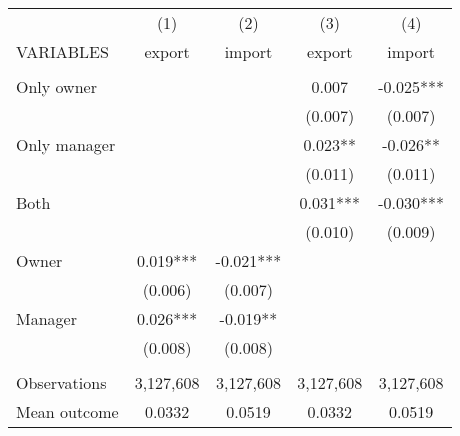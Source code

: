 \begin{tabular}{lcccc} \hline
 & (1) & (2) & (3) & (4) \\
VARIABLES & export & import & export & import \\ \hline
 &  &  &  &  \\
Only owner &  &  & 0.007 & -0.025*** \\
 &  &  & (0.007) & (0.007) \\
Only manager &  &  & 0.023** & -0.026** \\
 &  &  & (0.011) & (0.011) \\
Both &  &  & 0.031*** & -0.030*** \\
 &  &  & (0.010) & (0.009) \\
Owner & 0.019*** & -0.021*** &  &  \\
 & (0.006) & (0.007) &  &  \\
Manager & 0.026*** & -0.019** &  &  \\
 & (0.008) & (0.008) &  &  \\
 &  &  &  &  \\
Observations & 3,127,608 & 3,127,608 & 3,127,608 & 3,127,608 \\
 Mean outcome & 0.0332 & 0.0519 & 0.0332 & 0.0519 \\ \hline
\end{tabular}
